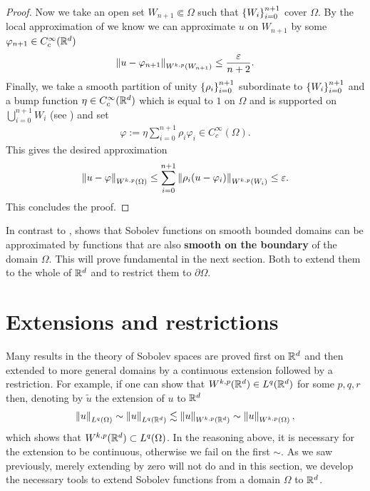\documentclass[
    a4paper,
    DIV=14,
    abstract=true,
    numbers=noenddot
]{scrartcl}
\begin{document}
\begin{proof}
	Now we take an open set $W_{n+1} \Subset \Omega$ such that $\left\{W_i\right\}_{i=0}^{n+1} $ cover $\Omega$. By the local approximation of  we know we can approximate  $u$ on  $W_{n+1}$ by some $\varphi_{n+1} \in C_c^\infty(\mathbb{R}^d)$
	\begin{align*}
		\left\lVert u-\varphi_{n+1} \right\rVert_{W^{k,p}(W_{n+1})}\leq\frac{\varepsilon}{n+2} .
	\end{align*}
	Finally, we take a smooth partition of unity $\left\{\rho _i\right\}_{i=0}^{n+1}$ subordinate to $\left\{W_i\right\}_{i=0}^{n+1} $ and a bump function $\eta \in C_c^\infty(\mathbb{R}^d)$ which is equal to $1$ on  $\Omega$ and is supported on $\bigcup_{i=0}^{n+1} W_i$ (see ) and set
	\begin{align*}
		\varphi:= \eta \sum_{i=0}^{n+1} \rho _i \varphi_i \in  C^\infty_c(\Omega) .
	\end{align*}
	This gives the desired approximation
	\begin{align*}
		\left\lVert u-\varphi \right\rVert_{W^{k,p}(\Omega)} \leq \sum_{i=0}^{n+1} \left\lVert \rho _i(u-\varphi_i) \right\rVert_{W^{k,p}(W_i)} \leq  \varepsilon  .
	\end{align*}
	This concludes the proof.
\end{proof}
In contrast to ,  shows that Sobolev functions on smooth bounded domains can be approximated by functions that are also \textbf{smooth on the boundary} of the domain $\Omega$. This will prove fundamental in the next section. Both to extend them to the whole of $\mathbb{R}^d$ and to restrict them to $\partial \Omega$.
\section{Extensions and restrictions}\label{extension section}

Many results in the theory of Sobolev spaces are proved first on $\mathbb{R}^d$ and then extended to more general domains by a continuous extension followed by a restriction. For example, if one can show that $W^{k,p}(\mathbb{R}^d) \in L^q(\mathbb{R}^d)$ for some $p,q,r$ then, denoting by $\tilde{u}$ the extension of $u$ to $\mathbb{R}^d$
\begin{align*}
	\left\lVert u \right\rVert_{L^q(\Omega)} \sim  \left\lVert u \right\rVert_{L^q(\mathbb{R}^d)} \lesssim \left\lVert u \right\rVert_{W^{k,p}(\mathbb{R}^d)} \sim \left\lVert u \right\rVert_{W^{k,p}(\Omega)},
\end{align*}
which shows that $W^{k,p}(\mathbb{R}^d) \subset L^q(\Omega)$. In the reasoning above, it is necessary for the extension to be continuous, otherwise we fail on the first $\sim$. As we saw previously, merely extending by zero will not do and in this section, we develop the necessary tools to extend Sobolev functions from a domain $\Omega$ to $\mathbb{R}^d$.
\end{document}
